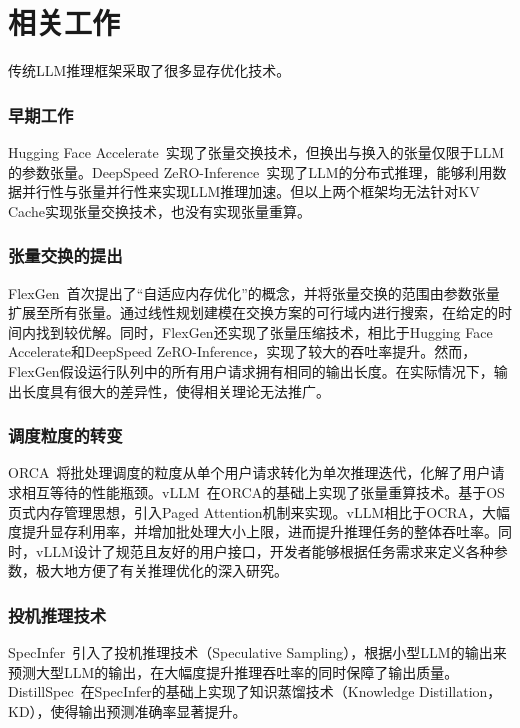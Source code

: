 \section{相关工作}

传统LLM推理框架采取了很多显存优化技术。

\subsubsection{早期工作}

Hugging Face Accelerate~\cite{Huggingface-Accelerate}实现了张量交换技术，但换出与换入的张量仅限于LLM的参数张量。DeepSpeed ZeRO-Inference~\cite{GPT-175B资源消耗}实现了LLM的分布式推理，能够利用数据并行性与张量并行性来实现LLM推理加速。但以上两个框架均无法针对KV Cache实现张量交换技术，也没有实现张量重算。
  
\subsubsection{张量交换的提出}

FlexGen~\cite{Swapping}首次提出了“自适应内存优化”的概念，并将张量交换的范围由参数张量扩展至所有张量。通过线性规划建模在交换方案的可行域内进行搜索，在给定的时间内找到较优解。同时，FlexGen还实现了张量压缩技术，相比于Hugging Face Accelerate和DeepSpeed ZeRO-Inference，实现了较大的吞吐率提升。然而，FlexGen假设运行队列中的所有用户请求拥有相同的输出长度。在实际情况下，输出长度具有很大的差异性，使得相关理论无法推广。
  
\subsubsection{调度粒度的转变}

ORCA~\cite{ORCA}将批处理调度的粒度从单个用户请求转化为单次推理迭代，化解了用户请求相互等待的性能瓶颈。vLLM~\cite{vLLM}在ORCA的基础上实现了张量重算技术。基于OS页式内存管理思想，引入Paged Attention机制来实现。vLLM相比于OCRA，大幅度提升显存利用率，并增加批处理大小上限，进而提升推理任务的整体吞吐率。同时，vLLM设计了规范且友好的用户接口，开发者能够根据任务需求来定义各种参数，极大地方便了有关推理优化的深入研究。
  
\subsubsection{投机推理技术}

SpecInfer~\cite{SpecInfer}引入了投机推理技术（Speculative Sampling），根据小型LLM的输出来预测大型LLM的输出，在大幅度提升推理吞吐率的同时保障了输出质量。DistillSpec~\cite{DistillSpec}在SpecInfer的基础上实现了知识蒸馏技术（Knowledge Distillation，KD），使得输出预测准确率显著提升。

